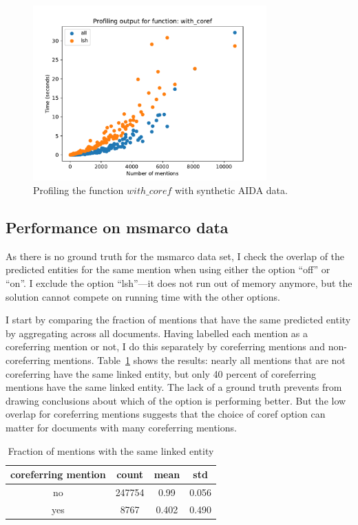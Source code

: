 \documentclass[a4paper,11pt]{article}
\numberwithin{equation}{section} %
\begin{document}
\begin{figure}[H]
  \centering
  \includegraphics[width = 0.8\textwidth]{../figs/profile_aida_scale.pdf}
  \caption{Profiling the function $with\_coref$ with synthetic AIDA data.}
  \label{fig:profile_aida_scale}
\end{figure}



\subsection{Performance on msmarco data}

As there is no ground truth for the msmarco data set, I check the overlap of the predicted entities for the same mention when using either the option ``off'' or ``on''. I exclude the option ``lsh''---it does not run out of memory anymore, but the solution cannot compete on running time with the other options. 

I start by comparing the fraction of mentions that have the same predicted entity by aggregating across all documents. Having labelled each mention as a coreferring mention or not, I do this separately by coreferring mentions and non-coreferring mentions. Table~\ref{tab:performance_msmarco_avg} shows the results: nearly all mentions that are not coreferring have the same linked entity, but only 40 percent of coreferring mentions have the same linked entity. 
The lack of a ground truth prevents from drawing conclusions about which of the option is performing better. But the low overlap for coreferring mentions suggests that the choice of coref option can matter for documents with many coreferring mentions.

\begin{table}
 \begin{tabular}{c c c c}
 \hline
 coreferring mention & count & mean & std \\
 \hline 
 no & 247754 & 0.99 & 0.056  \\  
 yes & 8767 & 0.402 & 0.490 \\ 
\hline 
\end{tabular}
\caption{Fraction of mentions with the same linked entity}
\label{tab:performance_msmarco_avg}
\end{table}
\end{document}
